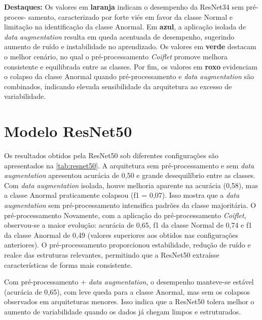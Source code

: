 \begin{flushleft}
\footnotesize
\textbf{Destaques:} Os valores em \textbf{laranja} indicam o desempenho da ResNet34
sem pré-proces-
\newline samento, caracterizado por forte viés em favor da classe Normal e
limitação na identificação da classe Anormal.
Em \textbf{azul}, a aplicação isolada de \textit{data augmentation} resulta em queda acentuada
de desempenho, sugerindo aumento de ruído e instabilidade no aprendizado.
Os valores em \textbf{verde} destacam o melhor cenário, no qual o pré-processamento
\textit{Coiflet} promove melhora consistente e equilibrada entre as classes.
Por fim, os valores em \textbf{roxo} evidenciam o colapso da classe Anormal quando
pré-processamento e \textit{data augmentation} são combinados, indicando elevada sensibilidade
da arquitetura ao excesso de variabilidade.
\end{flushleft}


\section*{Modelo ResNet50}

Os resultados obtidos pela ResNet50 sob diferentes configurações são apresentados na \autoref{tab:resnet50}. A arquitetura sem pré-processamento e sem \textit{data augmentation} apresentou acurácia de 0{,}50 e grande desequilíbrio entre as classes. Com \textit{data augmentation} isolada, houve melhoria aparente na acurácia (0{,}58), mas a classe Anormal praticamente colapsou (f1 = 0{,}07). Isso mostra que a \textit{data augmentation} sem pré-processamento intensifica padrões da classe majoritária. O pré-processamento
Novamente, com a aplicação do pré-processamento \textit{Coiflet}, observou-se a maior evolução: acurácia de 0{,}65, f1 da classe Normal de 0{,}74 e f1 da classe Anormal de 0{,}49 (valores superiores aos obtidos nas configurações anteriores). O pré-processamento proporcionou estabilidade, redução de ruído e realce das estruturas relevantes, permitindo que a ResNet50 extraísse características de forma mais consistente.

Com pré-processamento + \textit{data augmentation}, o desempenho manteve-se estável (acurácia de 0{,}65), com leve queda para a classe Anormal, mas sem os colapsos observados em arquiteturas menores. Isso indica que a ResNet50 tolera melhor o aumento de variabilidade quando os dados já chegam limpos e estruturados.

